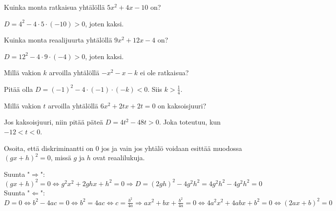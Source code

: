 \begin{tehtava}
	Kuinka monta ratkaisua yhtälöllä $5x^2+4x-10$ on?
	\begin{vastaus}
		$D=4^2-4\cdot 5 \cdot (-10)>0$, joten kaksi.
	\end{vastaus}
\end{tehtava}

\begin{tehtava}
	Kuinka monta reaalijuurta yhtälöllä $9x^2+12x-4$ on?
	\begin{vastaus}
		$D=12^2-4 \cdot 9 \cdot (-4) >0$, joten kaksi.
	\end{vastaus}
\end{tehtava}

\begin{tehtava}
	Millä vakion $k$ arvoilla yhtälöllä $-x^2-x-k$ ei ole ratkaisua?
	\begin{vastaus}
		Pitää olla $D=(-1)^2-4 \cdot (-1) \cdot (-k)<0$. Siis $k>\frac{1}{4}$.
	\end{vastaus}
\end{tehtava}

\begin{tehtava}
	Millä vakion $t$ arvoilla yhtälöllä $6x^2+2tx+2t=0$ on kaksoisjuuri?
	\begin{vastaus}
		Jos kaksoisjuuri, niin pitää päteä $D=4t^2-48t>0$. Joka toteutuu, kun $-12 < t < 0$.
	\end{vastaus}
\end{tehtava}

\begin{tehtava}
	Osoita, että diskriminantti on $0$ jos ja vain jos yhtälö voidaan esittää muodossa $(gx+h)^2=0$, missä $g$ ja $h$ ovat reaalilukuja.
	\begin{vastaus}
		Suunta "$\Rightarrow$": $(gx+h)^2=0 \Leftrightarrow g^2x^2+2ghx+h^2=0 \Rightarrow D=(2gh)^2-4g^2h^2=4g^2h^2-4g^2h^2=0$ \\
		Suunta "$\Leftarrow$": $D=0 \Leftrightarrow b^2-4ac=0 \Leftrightarrow b^2=4ac \Leftrightarrow c=\frac{b^2}{4a} \Rightarrow ax^2+bx+\frac{b^2}{4a}=0 \Leftrightarrow 4a^2x^2+4abx+b^2=0 \Leftrightarrow (2ax+b)^2=0$
	\end{vastaus}
\end{tehtava}
